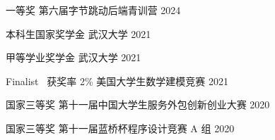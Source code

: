 

\begin{cvhonors}

  \cvhonor
    {一等奖} %
    {第六届字节跳动后端青训营} %
    {} %
    {2024} %

  \cvhonor
    {本科生国家奖学金}
    {武汉大学}
    {}
    {2021}

  \cvhonor
    {甲等学业奖学金}
    {武汉大学}
    {}
    {2021}

  \cvhonor
    {Finalist \, 获奖率 2\%}
    {美国大学生数学建模竞赛}
    {}
    {2021}
  
  \cvhonor
    {国家三等奖}
    {第十一届中国大学生服务外包创新创业大赛}
    {}
    {2020}

  \cvhonor
    {国家三等奖}
    {第十一届蓝桥杯程序设计竞赛 A 组}
    {}
    {2020}

\end{cvhonors}
